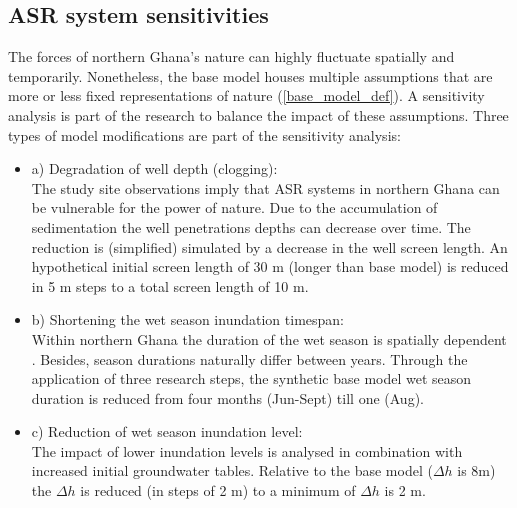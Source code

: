 
\subsection{ASR system sensitivities}
\label{subsec:sensitivity}
The forces of northern Ghana's nature can highly fluctuate spatially and temporarily. Nonetheless, the base model houses multiple assumptions that are more or less fixed representations of nature (\ref{base_model_def}). A sensitivity analysis is part of the research to balance the impact of these assumptions. Three types of model modifications are part of the sensitivity analysis: 

\begin{itemize}
\item{a) Degradation of well depth (clogging):} \\
The study site observations imply that ASR systems in northern Ghana can be vulnerable for the power of nature. Due to the accumulation of sedimentation the well penetrations depths can decrease over time. The reduction is (simplified) simulated by a decrease in the well screen length. An hypothetical initial screen length of 30 m (longer than base model) is reduced in 5 m steps to a total screen length of 10 m.
\item{b) Shortening the wet season inundation timespan:} \\
Within northern Ghana the duration of the wet season is spatially dependent \citep{HAP2011}. Besides, season durations naturally differ between years. Through the application of three research steps, the synthetic base model wet season duration is reduced from four months (Jun-Sept) till one (Aug).  
\item{c) Reduction of wet season inundation level:} \\
The impact of lower inundation levels is analysed in combination with increased initial groundwater tables. Relative to the base model ($\Delta h$ is 8m) the $\Delta h$ is reduced (in steps of 2 m) to a minimum of $\Delta h$ is 2 m.   
\end{itemize}

